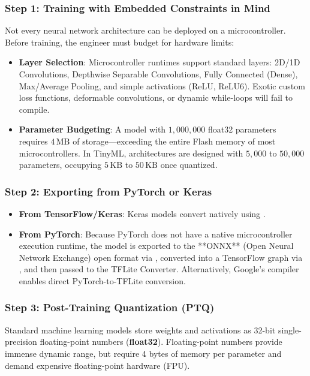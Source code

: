 \subsubsection{Step 1: Training with Embedded Constraints in Mind}
Not every neural network architecture can be deployed on a microcontroller. Before training, the engineer must budget for hardware limits:
\begin{itemize}
    \item \textbf{Layer Selection}: Microcontroller runtimes support standard layers: 2D/1D Convolutions, Depthwise Separable Convolutions, Fully Connected (Dense), Max/Average Pooling, and simple activations (ReLU, ReLU6). Exotic custom loss functions, deformable convolutions, or dynamic while-loops will fail to compile.
    \item \textbf{Parameter Budgeting}: A model with $1{,}000{,}000$ float32 parameters requires $4\,\text{MB}$ of storage---exceeding the entire Flash memory of most microcontrollers. In TinyML, architectures are designed with $5{,}000$ to $50{,}000$ parameters, occupying $5\,\text{KB}$ to $50\,\text{KB}$ once quantized.
\end{itemize}

\subsubsection{Step 2: Exporting from PyTorch or Keras}
\begin{itemize}
    \item \textbf{From TensorFlow/Keras}: Keras models convert natively using .
    \item \textbf{From PyTorch}: Because PyTorch does not have a native microcontroller execution runtime, the model is exported to the **ONNX** (Open Neural Network Exchange) open format via , converted into a TensorFlow graph via , and then passed to the TFLite Converter. Alternatively, Google's  compiler enables direct PyTorch-to-TFLite conversion.
\end{itemize}

\subsubsection{Step 3: Post-Training Quantization (PTQ)}
Standard machine learning models store weights and activations as 32-bit single-precision floating-point numbers (\textbf{float32}). Floating-point numbers provide immense dynamic range, but require 4 bytes of memory per parameter and demand expensive floating-point hardware (FPU).

